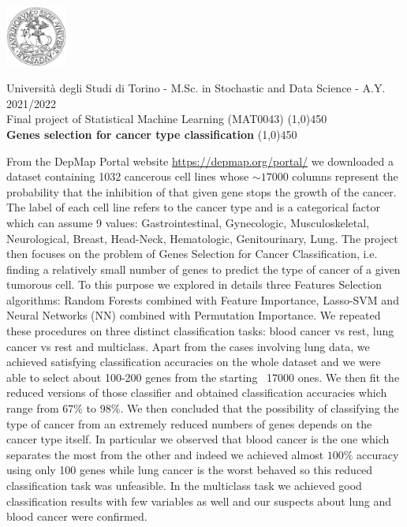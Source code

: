 \documentclass[a4paper,11pt, oneside]{article}  %
\begin{document}
\setcounter{secnumdepth}{2}
\pagestyle{plain} %

\centerline {\includegraphics[width=2cm]{logo.jpg}}
\begin{center}
Università degli Studi di Torino - M.Sc.  in Stochastic and Data Science - A.Y.  2021/2022 \\
\Large { Final project of Statistical Machine Learning (MAT0043)}
\line(1,0){450}\\ 
\vspace{0.4cm} 
{ \huge \textbf{Genes selection for cancer type classification} }
\vspace{0.1cm}
\line(1,0){450} \\
\end{center}

From the DepMap Portal website \url{https://depmap.org/portal/} we downloaded a dataset containing 1032 cancerous cell lines whose $\sim 17000$ columns represent the probability that the inhibition of that given gene stops the growth of the cancer.  The label of each cell line refers to the cancer type and is a categorical factor which can assume 9 values: Gastrointestinal,  Gynecologic,  Musculoskeletal,  Neurological,  Breast,  Head-Neck,  Hematologic,  Genitourinary,  Lung.  The project then focuses on the problem of Genes Selection for Cancer Classification,  i.e.  finding a relatively small number of genes to predict the type of cancer of a given tumorous cell.  To this purpose we explored in details three Features Selection algorithms: Random Forests combined with Feature Importance,  Lasso-SVM and Neural Networks (NN) combined with Permutation Importance.  We repeated these procedures on three distinct classification tasks: blood cancer vs rest,  lung cancer vs rest and multiclass.  Apart from the cases involving lung data,  we achieved satisfying classification accuracies on the whole dataset and we were able to select about 100-200 genes from the starting ~17000 ones.  We then fit the reduced versions of those classifier and obtained classification accuracies which range from $67\%$ to $98\%$.  We then concluded that the possibility of classifying the type of cancer from an extremely reduced numbers of genes depends on the cancer type itself.  In particular we observed that blood cancer is the one which separates the most from the other and indeed we achieved almost $100\%$ accuracy using only 100 genes while lung cancer is the worst behaved so this reduced classification task was unfeasible.  In the multiclass task we achieved good classification results with few variables as well and our suspects about lung and blood cancer were confirmed.  
\end{document}
